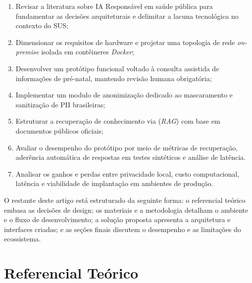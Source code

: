 \documentclass[12pt]{article}
\begin{document}
\begin{enumerate}
  \item Revisar a literatura sobre IA Responsável em saúde pública para fundamentar as decisões arquiteturais e delimitar a lacuna tecnológica no contexto do SUS;
  \item Dimensionar os requisitos de hardware e projetar uma topologia de rede \textit{on-premise} isolada em contêineres \textit{Docker};
  \item Desenvolver um protótipo funcional voltado à consulta assistida de informações de pré-natal, mantendo revisão humana obrigatória;
  \item Implementar um modulo de anonimização dedicado ao mascaramento e sanitização de PII brasileiras;
  \item Estruturar a recuperação de conhecimento via (\textit{RAG}) com base em documentos públicos oficiais;
  \item Avaliar o desempenho do protótipo por meio de métricas de recuperação, aderência automática de respostas em testes sintéticos e análise de latência.
  \item Analisar os ganhos e perdas entre privacidade local, custo computacional, latência e viabilidade de implantação em ambientes de produção.
\end{enumerate}

O restante deste artigo está estruturado da seguinte forma: o referencial teórico embasa as decisões de design; os materiais e a metodologia detalham o ambiente e o fluxo de desenvolvimento; a solução proposta apresenta a arquitetura e interfaces criadas; e as seções finais discutem o desempenho e as limitações do ecossistema.


\section{Referencial Teórico}
\end{document}

